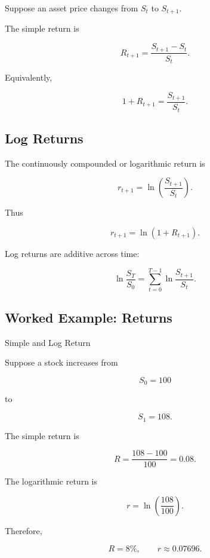 Suppose an asset price changes from \(S_t\) to \(S_{t+1}\).

The simple return is

\[
\boxed{
R_{t+1}
=
\frac{S_{t+1}-S_t}{S_t}.
}
\]

Equivalently,

\[
\boxed{
1+R_{t+1}
=
\frac{S_{t+1}}{S_t}.
}
\]

\subsection{Log Returns}
\label{subsec:log-returns}

The continuously compounded or logarithmic return is

\[
\boxed{
r_{t+1}
=
\ln
\left(
\frac{S_{t+1}}{S_t}
\right).
}
\]

Thus

\[
\boxed{
r_{t+1}
=
\ln(1+R_{t+1}).
}
\]

Log returns are additive across time:

\[
\boxed{
\ln\frac{S_T}{S_0}
=
\sum_{t=0}^{T-1}
\ln\frac{S_{t+1}}{S_t}.
}
\]

\subsection{Worked Example: Returns}
\label{subsec:worked-financial-returns}

\begin{workedexamplebox}{Simple and Log Return}

Suppose a stock increases from

\[
S_0=100
\]

to

\[
S_1=108.
\]

The simple return is

\[
R
=
\frac{108-100}{100}
=
0.08.
\]

The logarithmic return is

\[
r
=
\ln\left(\frac{108}{100}\right).
\]

Therefore,

\begin{answerbox}
\[
\boxed{
R=8\%,
\qquad
r\approx0.07696.
}
\]
\end{answerbox}

\end{workedexamplebox}

